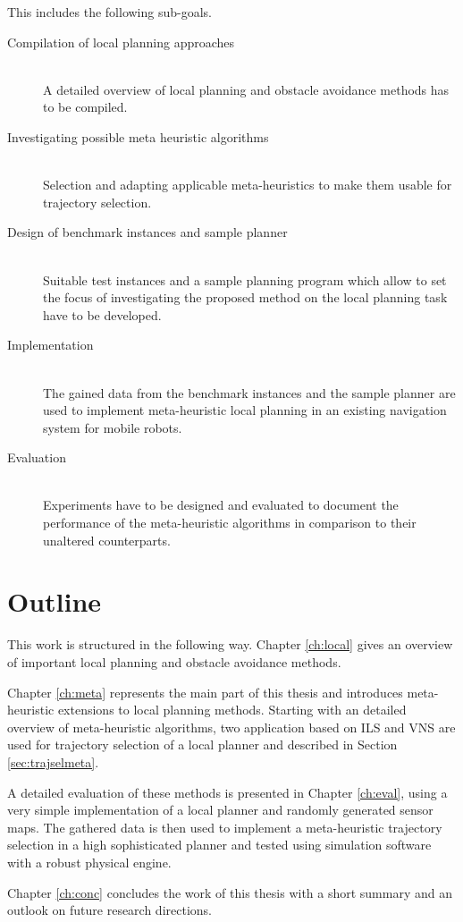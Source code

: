 This includes the following sub-goals.
\begin{description}
\item[Compilation of local planning approaches]\hfill \\
A detailed overview of local planning and obstacle avoidance methods has to be compiled. 
\item[Investigating possible meta heuristic algorithms]\hfill \\
Selection and adapting applicable meta-heuristics to make them usable for trajectory selection.
\item[Design of benchmark instances and sample planner]\hfill \\
Suitable test instances and a sample planning program which allow to set the focus of investigating the proposed method on the local planning task have to be developed.  
\item[Implementation]\hfill \\
The gained data from the benchmark instances and the sample planner are used to implement meta-heuristic local planning in an existing navigation system for mobile robots.  
\item[Evaluation]\hfill \\
Experiments have to be designed and evaluated to document the performance of the meta-heuristic algorithms in comparison to their unaltered counterparts.
\end{description}

\section{Outline}\label{sec:outline}
This work is structured in the following way. 
Chapter \ref{ch:local} gives an overview of important local planning and obstacle avoidance methods.
 
Chapter \ref{ch:meta} represents the main part of this thesis and introduces meta-heuristic extensions to local planning methods. 
Starting with an detailed overview of  meta-heuristic algorithms, two application based on ILS and VNS are used for trajectory selection of a local planner and described in Section \ref{sec:trajselmeta}.

A detailed evaluation of these methods is presented in Chapter \ref{ch:eval}, using a very simple implementation of a local planner and randomly generated sensor maps. 
The gathered data is then used to implement a meta-heuristic trajectory selection in a high sophisticated planner and tested using simulation software with a robust physical engine.

Chapter \ref{ch:conc} concludes the work of this thesis with a short summary and an outlook on future research directions.




